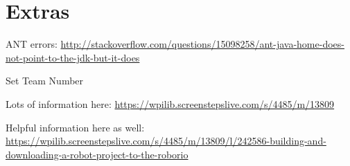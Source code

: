 \documentclass{article}
\begin{document}
\begin{enumerate}
\end{enumerate}

\section{Extras}
ANT errors:
\url{http://stackoverflow.com/questions/15098258/ant-java-home-does-not-point-to-the-jdk-but-it-does}

Set Team Number

Lots of information here:
\url{https://wpilib.screenstepslive.com/s/4485/m/13809}

Helpful information here as well:
\url{https://wpilib.screenstepslive.com/s/4485/m/13809/l/242586-building-and-downloading-a-robot-project-to-the-roborio}
\end{document}
